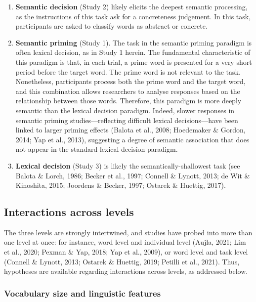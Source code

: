 \documentclass[
  12pt,
  man,floatsintext]{apa7}
\begin{document}
\begin{enumerate}
\def\labelenumi{\arabic{enumi}.}
\item
  \textbf{Semantic decision} (Study 2) likely elicits the deepest semantic processing, as the instructions of this task ask for a concreteness judgement. In this task, participants are asked to classify words as abstract or concrete.
\item
  \textbf{Semantic priming} (Study 1). The task in the semantic priming paradigm is often lexical decision, as in Study 1 herein. The fundamental characteristic of this paradigm is that, in each trial, a prime word is presented for a very short period before the target word. The prime word is not relevant to the task. Nonetheless, participants process both the prime word and the target word, and this combination allows researchers to analyse responses based on the relationship between those words. Therefore, this paradigm is more deeply semantic than the lexical decision paradigm. Indeed, slower responses in semantic priming studies---reflecting difficult lexical decisions---have been linked to larger priming effects (Balota et al., 2008; Hoedemaker \& Gordon, 2014; Yap et al., 2013), suggesting a degree of semantic association that does not appear in the standard lexical decision paradigm.
\item
  \textbf{Lexical decision} (Study 3) is likely the semantically-shallowest task (see Balota \& Lorch, 1986; Becker et al., 1997; Connell \& Lynott, 2013; de Wit \& Kinoshita, 2015; Joordens \& Becker, 1997; Ostarek \& Huettig, 2017).
\end{enumerate}

\hypertarget{interactions-across-levels}{%
\subsection{Interactions across levels}\label{interactions-across-levels}}

The three levels are strongly intertwined, and studies have probed into more than one level at once: for instance, word level and individual level (Aujla, 2021; Lim et al., 2020; Pexman \& Yap, 2018; Yap et al., 2009), or word level and task level (Connell \& Lynott, 2013; Ostarek \& Huettig, 2019; Petilli et al., 2021). Thus, hypotheses are available regarding interactions across levels, as addressed below.

\hypertarget{vocabulary-size-and-linguistic-features}{%
\subsubsection{Vocabulary size and linguistic features}\label{vocabulary-size-and-linguistic-features}}
\end{document}
